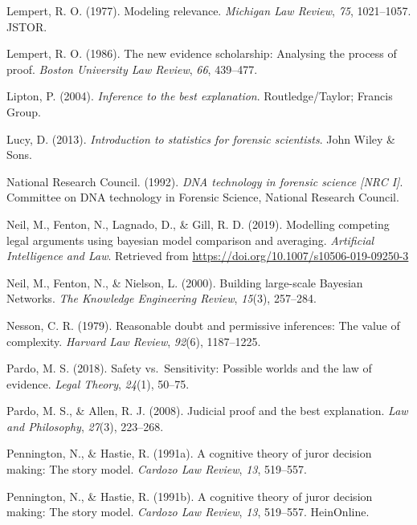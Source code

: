 \documentclass[11pt,dvipsnames,enabledeprecatedfontcommands]{scrartcl}
\begin{document}
\leavevmode\hypertarget{ref-lempert1977modeling}{}%
Lempert, R. O. (1977). Modeling relevance. \emph{Michigan Law Review},
\emph{75}, 1021--1057. JSTOR.

\leavevmode\hypertarget{ref-Lempert1986}{}%
Lempert, R. O. (1986). The new evidence scholarship: Analysing the
process of proof. \emph{Boston University Law Review}, \emph{66},
439--477.

\leavevmode\hypertarget{ref-Lipton2004-LIPITT}{}%
Lipton, P. (2004). \emph{Inference to the best explanation}.
Routledge/Taylor; Francis Group.

\leavevmode\hypertarget{ref-lucy2013introduction}{}%
Lucy, D. (2013). \emph{Introduction to statistics for forensic
scientists}. John Wiley \& Sons.

\leavevmode\hypertarget{ref-NRCI1992}{}%
National Research Council. (1992). \emph{DNA technology in forensic
science \textup{{[}NRC I{]}}}. Committee on DNA technology in Forensic
Science, National Research Council.

\leavevmode\hypertarget{ref-Fenton2019Modelling}{}%
Neil, M., Fenton, N., Lagnado, D., \& Gill, R. D. (2019). Modelling
competing legal arguments using bayesian model comparison and averaging.
\emph{Artificial Intelligence and Law}. Retrieved from
\url{https://doi.org/10.1007/s10506-019-09250-3}

\leavevmode\hypertarget{ref-neil2000BuildingLargescaleBayesian}{}%
Neil, M., Fenton, N., \& Nielson, L. (2000). Building large-scale
Bayesian Networks. \emph{The Knowledge Engineering Review},
\emph{15}(3), 257--284.

\leavevmode\hypertarget{ref-Nesson1979Reasonable-doub}{}%
Nesson, C. R. (1979). Reasonable doubt and permissive inferences: The
value of complexity. \emph{Harvard Law Review}, \emph{92}(6),
1187--1225.

\leavevmode\hypertarget{ref-pardo2018}{}%
Pardo, M. S. (2018). Safety vs.~Sensitivity: Possible worlds and the law
of evidence. \emph{Legal Theory}, \emph{24}(1), 50--75.

\leavevmode\hypertarget{ref-Pardo2008judicial}{}%
Pardo, M. S., \& Allen, R. J. (2008). Judicial proof and the best
explanation. \emph{Law and Philosophy}, \emph{27}(3), 223--268.

\leavevmode\hypertarget{ref-Pennington1991}{}%
Pennington, N., \& Hastie, R. (1991a). A cognitive theory of juror
decision making: The story model. \emph{Cardozo Law Review}, \emph{13},
519--557.

\leavevmode\hypertarget{ref-pennington1991cognitive}{}%
Pennington, N., \& Hastie, R. (1991b). A cognitive theory of juror
decision making: The story model. \emph{Cardozo Law Review}, \emph{13},
519--557. HeinOnline.
\end{document}
